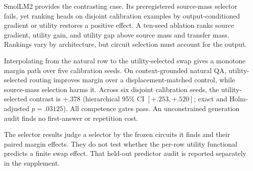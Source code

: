 \documentclass[letterpaper]{article} %
\begin{document}
SmolLM2 provides the contrasting case. Its preregistered source-mass selector fails, yet ranking heads on
disjoint calibration examples by output-conditioned gradient or utility restores a positive effect. A ten-seed
ablation ranks source gradient, utility gain, and utility gap above source mass and transfer mass. Rankings vary
by architecture, but circuit selection must account for the output.

Interpolating from the natural row to the utility-selected swap gives a monotone margin path over five
calibration seeds. On context-grounded natural QA, utility-selected routing improves margin over a
displacement-matched control, while source-mass selection harms it. Across six disjoint calibration seeds, the
utility-selected contrast is $+.378$ (hierarchical 95\% CI $[+.253,+.520]$; exact and Holm-adjusted
$p=.03125$). All competence gates pass. An unconstrained generation audit finds no first-answer or repetition
cost.

The selector results judge a selector by the frozen circuits it finds and their paired margin effects. They do
not test whether the per-row utility functional predicts a finite swap effect. That held-out predictor audit is
reported separately in the supplement.
\end{document}
